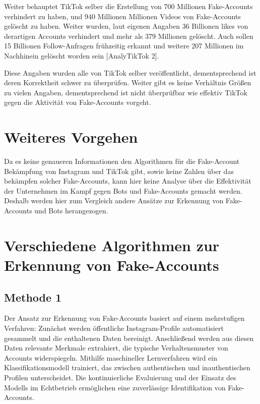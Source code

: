 \documentclass[12pt]{report}
\begin{document}
Weiter behauptet TikTok selber die Erstellung von 700 Millionen Fake-Accounts verhindert zu haben, und 940 Millionen Millionen Videos von Fake-Accounts gelöscht zu haben. Weiter wurden, laut eigenen Angaben 36 Billionen likes von derartigen Accounts verhindert und mehr als 379 Millionen gelöscht. Auch sollen 15 Billionen Follow-Anfragen frühzeitig erkannt und weitere 207 Millionen im Nachhinein gelöscht worden sein [AnalyTikTok 2].
\newline

Diese Angaben wurden alle von TikTok selber veröffentlicht, dementsprechend ist deren Korrektheit schwer zu überprüfen. Weiter gibt es keine Verhältnis Größen zu vielen Angaben, dementsprechend ist nicht überprüfbar wie effektiv TikTok gegen die Aktivität von Fake-Accounts vorgeht.


\section{Weiteres Vorgehen}
Da es keine genaueren Informationen den Algorithmen für die Fake-Account Bekämpfung von Instagram und TikTok
gibt, sowie keine Zahlen über das bekämpfen solcher Fake-Accounts, kann hier keine Analyse über die Effektivität der Unternehmen im Kampf gegen Bots und Fake-Accounts gemacht werden. Deshalb werden hier zum Vergleich andere Ansätze zur Erkennung von Fake-Accounts und Bots herangezogen.




\section{Verschiedene Algorithmen zur Erkennung von Fake-Accounts}


\subsection{Methode 1}
Der Ansatz zur Erkennung von Fake-Accounts basiert auf einem mehrstufigen Verfahren: Zunächst werden öffentliche Instagram-Profile automatisiert gesammelt und die enthaltenen Daten bereinigt. Anschließend werden aus diesen Daten relevante Merkmale extrahiert, die typische Verhaltensmuster von Accounts widerspiegeln. Mithilfe maschineller Lernverfahren wird ein Klassifikationsmodell trainiert, das zwischen authentischen und inauthentischen Profilen unterscheidet. Die kontinuierliche Evaluierung und der Einsatz des Modells im Echtbetrieb ermöglichen eine zuverlässige Identifikation von Fake-Accounts.
\newline
\end{document}
